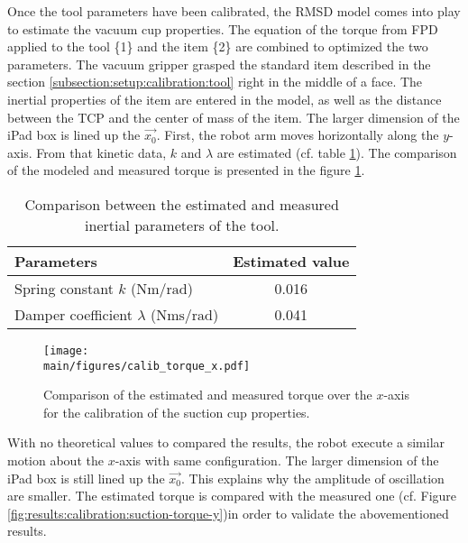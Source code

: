 \documentclass[/home/francois/latex/report/main.tex]{subfiles}
\begin{document}
Once the tool parameters have been calibrated, the \ac{RMSD} model comes into play to estimate the vacuum cup properties. The equation of the torque from \ac{FPD} applied to the tool \{1\} and the item \{2\} are combined to optimized the two parameters. The vacuum gripper grasped the standard item described in the section \ref{subsection:setup:calibration:tool} right in the middle of a face. The inertial properties of the item are entered in the model, as well as the distance between the \ac{TCP} and the center of mass of the item. The larger dimension of the iPad box is lined up the $\overrightarrow{x_0}$. First, the robot arm moves horizontally along the $y$-axis. From that kinetic data, $k$ and $\lambda$ are estimated (cf. table \ref{tab:results:calibration-cup}). The comparison of the modeled and measured torque is presented in the figure \ref{fig:results:calibration:suction-torque-x}.

\begin{table}[h]
  \begin{center}
    \renewcommand{\arraystretch}{1.2} %
    \begin{tabular}{l|c} %
      \textbf{Parameters} & \textbf{Estimated value} \\
      \hline
      Spring constant $k$ ($\si{\newton\meter\per\radian}$) & 0.016\\
      \hline
      Damper coefficient $\lambda$ ($\si{\newton\meter\second\per\radian}$) & 0.041 \\
      \hline
    \end{tabular}
  \end{center}
  \caption{Comparison between the estimated and measured inertial parameters of the tool.\label{tab:results:calibration-cup}}
\end{table}

\begin{figure}[h]
  \centering
  \texttt{[image: \\main/figures/calib\_torque\_x.pdf]}
  \caption{Comparison of the estimated and measured torque over the $x$-axis for the calibration of the suction cup properties.}
  \label{fig:results:calibration:suction-torque-x}
\end{figure}

With no theoretical values to compared the results, the robot execute a similar motion about the $x$-axis with same configuration. The larger dimension of the iPad box is still lined up the $\overrightarrow{x_0}$. This explains why the amplitude of oscillation are smaller. The estimated torque is compared with the measured one (cf. Figure \ref{fig:results:calibration:suction-torque-y})in order to validate the abovementioned results.
\end{document}
